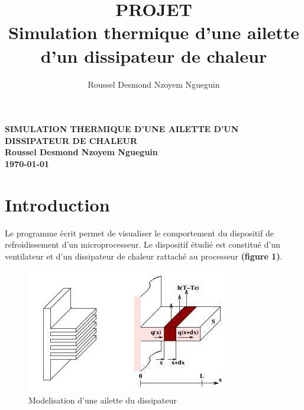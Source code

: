 \documentclass[11pt]{article} %
\title{PROJET \\ Simulation thermique d'une ailette d'un dissipateur de chaleur}
\author{Roussel Desmond Nzoyem Ngueguin}
\begin{document}
\begin{titlepage}

\centering
\vspace*{\fill}
\large \bf SIMULATION THERMIQUE D'UNE AILETTE D'UN DISSIPATEUR DE CHALEUR \\
\large \rm Roussel Desmond Nzoyem Ngueguin \\
\today \rm
\vspace*{\fill}


\end{titlepage}

\clearpage
{}	%

\section*{Introduction}

Le programme écrit permet de visualiser le comportement du dispositif de refroidissement d’un microprocesseur. Le dispositif étudié est constitué d’un ventilateur et d’un dissipateur de chaleur rattaché au processeur \textbf{(figure 1)}. 
	
\begin{figure}[!htb]
	\centering
	\includegraphics[scale=0.7]{fig_1}
	\caption{Modelisation d'une ailette du dissipateur}
\end{figure}
\end{document}
